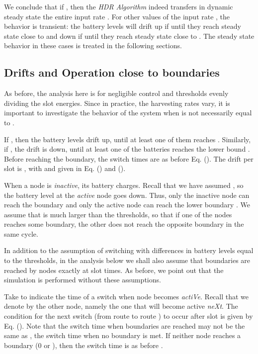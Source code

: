 \documentclass[12 pt]{article}
\begin{document}
We conclude that if , then the \emph{HDR Algorithm} indeed transfers in dynamic steady state the entire input rate .   For other values of the input rate , the behavior is transient:  the battery levels will drift up if  until they reach steady state close to  and down if  until they reach steady state close to .  The steady state behavior in these cases is treated in the following sections.


\subsection{Drifts and Operation close to boundaries}

As before, the analysis here is for negligible control and thresholds evenly dividing the slot energies.  Since in practice, the harvesting rates vary, it is important to investigate the behavior of the system  when  is not necessarily equal to .

If , then the battery levels drift up, until at least one of them reaches .  Similarly, if , the drift is down, until at least one of the batteries reaches the lower bound .  Before reaching the boundary, the switch times are as before Eq. ().  The drift per slot is , with  and  given in Eq. () and ().

When a node is \emph{inactive}, its battery charges. Recall that we have assumed , so the battery level at the \emph{active} node goes down.  Thus, only the inactive node can reach the boundary  and only the active node can reach the lower boundary .  We assume that  is much larger than the thresholds, so that if one of the nodes reaches some boundary, the other does not reach the opposite boundary in the same cycle.

In addition to the assumption of switching with differences in battery levels equal to the thresholds, in the analysis below we shall also assume that boundaries are reached by nodes exactly at slot times.  As before, we point out that the simulation is performed without these assumptions.

Take  to indicate the time of a switch when node  becomes \emph{actiVe}.  Recall that we denote by   the other node, namely the one that will become active \emph{neXt}.  The condition for the next switch (from route  to route ) to occur after slot  is given by Eq. ().  Note that the switch time  when boundaries are reached may not be the same as , the switch time when no boundary is met.
If neither node reaches a boundary (0 or ), then the switch time is as before .
\end{document}
